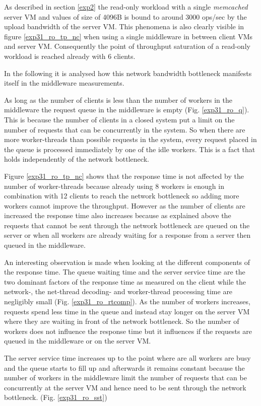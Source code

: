 \documentclass[11pt,a4paper]{article}
\begin{document}
As described in section \ref{exp2} the read-only workload with a single \emph{memcached} server VM and values of size of 4096B is bound to around 3000 ops/sec by the upload bandwidth of the server VM. This phenomena is also clearly visible in figure \ref{exp31_ro_tp_nc} when using a single middleware in between client VMs and server VM. Consequently the point of throughput saturation of a read-only workload is reached already with 6 clients. 

In the following it is analysed how this network bandwidth bottleneck manifests itself in the middleware measurements.

As long as the number of clients is less than the number of workers in the middleware the request queue in the middleware is empty (Fig. \ref{exp31_ro_q}). This is because the number of clients in a closed system put a limit on the number of requests that can be concurrently in the system. 
So when there are more worker-threads than possible requests in the system, every request placed in the queue is processed immediately by one of the idle workers. This is a fact that holds independently of the network bottleneck. 

Figure \ref{exp31_ro_tp_nc} shows that the response time is not affected by the number of worker-threads because already using 8 workers is enough in combination with 12 clients to reach the network bottleneck so adding more workers cannot improve the throughput. 
However as the number of clients are increased the response time also increases because as explained above the requests that cannot be sent through the network bottleneck are queued on the server or when all workers are already waiting for a response from a server then queued in the middleware.

An interesting observation is made when looking at the different components of the response time.
The queue waiting time and the server service time are the two dominant factors of the response time as measured on the client while the network-, the net-thread decoding- and worker-thread processing time are negligibly small  (Fig. \ref{exp31_ro_rtcomp}). As the number of workers increases, requests spend less time in the queue and instead stay longer on the server VM where they are waiting in front of the network bottleneck. 
So the number of workers does not influence the response time but it influences if the requests are queued in the middleware or on the server VM.

The server service time increases up to the point where are all workers are busy and the queue starts to fill up and afterwards it remains constant because the number of workers in the middleware limit the number of requests that can be concurrently at the server VM and hence need to be sent through the network bottleneck. (Fig. \ref{exp31_ro_sst})
\end{document}
